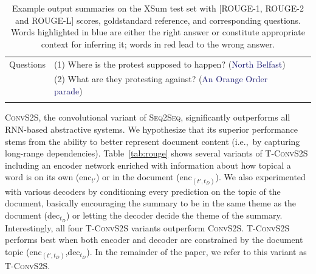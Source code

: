\begin{table}[t!]
{\begin{tabular}{l p{10.5cm} l}
      Questions &(1) {Where is the protest supposed to happen?}
      (\textcolor{midnightblue}{North Belfast}) \\ 
&(2) {What are they protesting against?} (\textcolor{midnightblue}{An Orange Order parade}) \\
      \thickhline

    \end{tabular}     
  }
  \caption{Example output summaries on the XSum test set with [ROUGE-1,
    ROUGE-2 and ROUGE-L] scores, goldstandard reference, and
    corresponding questions. Words highlighted in blue are either the
    right answer or constitute appropriate context for inferring it;
    words in red lead to the wrong
    answer. }\label{tab:erroranalysis}
\end{table}


\textsc{ConvS2S}, the convolutional variant of \textsc{Seq2Seq},
significantly outperforms all \mbox{RNN-based} abstractive systems. We
hypothesize that its superior performance stems from the ability to
better represent document content (i.e.,~by capturing long-range
dependencies).
Table~\ref{tab:rouge} shows several variants of \textsc{T-ConvS2S}
including an encoder network enriched with information about how
topical a word is on its own (enc$_{t'}$) or in the document
(enc$_{(t',t_D)}$).  We also experimented with various decoders by
conditioning every prediction on the topic of the document, basically
encouraging the summary to be in the same theme as the document
(dec$_{t_D}$) or letting the decoder decide the theme of the
summary. Interestingly, all four \textsc{T-ConvS2S} variants
outperform \textsc{ConvS2S}. \textsc{T-ConvS2S} performs best when
both encoder and decoder are constrained by the document topic
(enc$_{(t',t_D)}$,dec$_{t_D}$). In the remainder of the paper, we
refer to this variant as \textsc{T-ConvS2S}.


